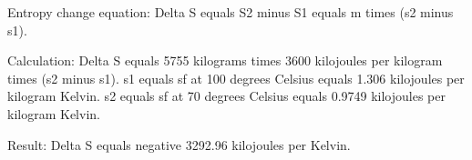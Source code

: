 Entropy change equation:  
Delta S equals S2 minus S1 equals m times (s2 minus s1).  

Calculation:  
Delta S equals 5755 kilograms times 3600 kilojoules per kilogram times (s2 minus s1).  
s1 equals sf at 100 degrees Celsius equals 1.306 kilojoules per kilogram Kelvin.  
s2 equals sf at 70 degrees Celsius equals 0.9749 kilojoules per kilogram Kelvin.  

Result:  
Delta S equals negative 3292.96 kilojoules per Kelvin.